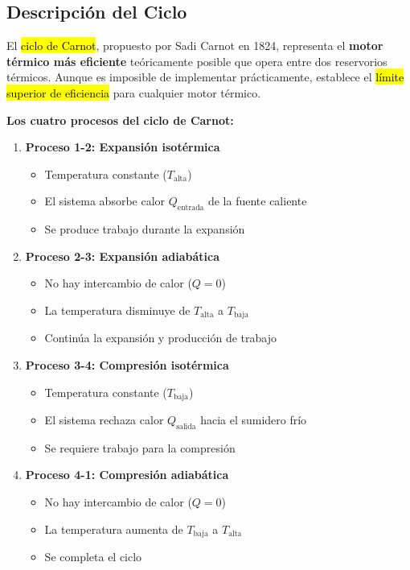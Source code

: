 \documentclass{article}
\begin{document}
\subsection*{Descripción del Ciclo}

El \hl{ciclo de Carnot}, propuesto por Sadi Carnot en 1824, representa el \textbf{motor térmico más eficiente} teóricamente posible que opera entre dos reservorios térmicos. Aunque es imposible de implementar prácticamente, establece el \hl{límite superior de eficiencia} para cualquier motor térmico.

\textbf{Los cuatro procesos del ciclo de Carnot:}

\begin{enumerate}
    \item \textbf{Proceso 1-2: Expansión isotérmica}
    \begin{itemize}
        \item Temperatura constante ($T_{\text{alta}}$)
        \item El sistema absorbe calor $Q_{\text{entrada}}$ de la fuente caliente
        \item Se produce trabajo durante la expansión
    \end{itemize}
    
    \item \textbf{Proceso 2-3: Expansión adiabática}
    \begin{itemize}
        \item No hay intercambio de calor ($Q = 0$)
        \item La temperatura disminuye de $T_{\text{alta}}$ a $T_{\text{baja}}$
        \item Continúa la expansión y producción de trabajo
    \end{itemize}
    
    \item \textbf{Proceso 3-4: Compresión isotérmica}
    \begin{itemize}
        \item Temperatura constante ($T_{\text{baja}}$)
        \item El sistema rechaza calor $Q_{\text{salida}}$ hacia el sumidero frío
        \item Se requiere trabajo para la compresión
    \end{itemize}
    
    \item \textbf{Proceso 4-1: Compresión adiabática}
    \begin{itemize}
        \item No hay intercambio de calor ($Q = 0$)
        \item La temperatura aumenta de $T_{\text{baja}}$ a $T_{\text{alta}}$
        \item Se completa el ciclo
    \end{itemize}
\end{enumerate}
\end{document}

